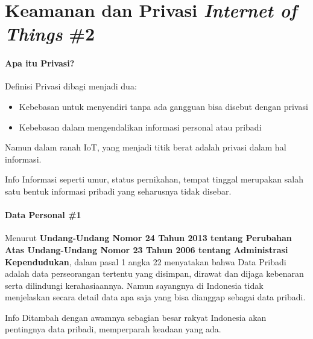 

\section{Keamanan dan Privasi \textit{Internet of Things} \#2}
\begin{frame}{\insertsectionhead}
	\framesubtitle{Apa itu Privasi?}
	\justifying
	Definisi Privasi dibagi menjadi dua:
	\vfill
	\begin{itemize}
		\item Kebebasan untuk menyendiri tanpa ada gangguan bisa disebut dengan privasi
		\item Kebebasan dalam mengendalikan informasi personal atau pribadi 
	\end{itemize}
	\vfill
	Namun dalam ranah IoT, yang menjadi titik berat adalah privasi dalam hal informasi.
	\vfill
	\begin{block}{Info}
		Informasi seperti umur, status pernikahan, tempat tinggal merupakan salah satu bentuk informasi pribadi yang seharusnya tidak disebar.
	\end{block}
\end{frame}

\begin{frame}{\insertsectionhead}
	\framesubtitle{Data Personal \#1}
	\justifying
	Menurut \textbf{Undang-Undang Nomor 24 Tahun 2013 tentang Perubahan Atas Undang-Undang Nomor 23 Tahun 2006 tentang Administrasi Kependudukan}, dalam pasal 1 angka 22 menyatakan bahwa Data Pribadi adalah data perseorangan tertentu yang disimpan, dirawat dan dijaga kebenaran serta dilindungi kerahasiaannya.
	\vfill
	Namun sayangnya di Indonesia tidak menjelaskan secara detail data apa saja yang bisa dianggap sebagai data pribadi.
	\vfill
	\begin{block}{Info}
		Ditambah dengan awamnya sebagian besar rakyat Indonesia akan pentingnya data pribadi, memperparah keadaan yang ada.
	\end{block}
\end{frame}

